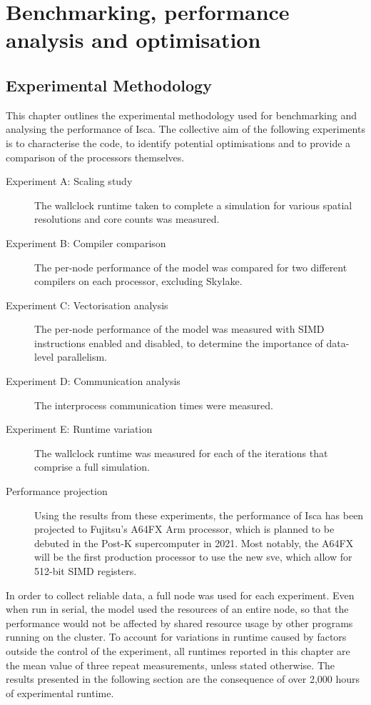 \documentclass[a4paper,11pt]{report}
\begin{document}
\part{Benchmarking, performance analysis and optimisation}
\chapter{Experimental Methodology}
This chapter outlines the experimental methodology used for benchmarking and analysing the performance of Isca. The collective aim of the following experiments is to characterise the code, to identify potential optimisations and to provide a comparison of the processors themselves.

\begin{description}

	\item[Experiment A: Scaling study] The wallclock runtime taken to complete a simulation for various spatial resolutions and core counts was measured.
	
	\item[Experiment B: Compiler comparison] The per-node performance of the model was compared for two different compilers on each processor, excluding Skylake.
	
	\item[Experiment C: Vectorisation analysis] The per-node performance of the model was measured with SIMD instructions enabled and disabled, to determine the importance of data-level parallelism. 
	
	\item[Experiment D: Communication analysis] The interprocess communication times were measured. 
	
	\item[Experiment E: Runtime variation] The wallclock runtime was measured for each of the iterations that comprise a full simulation.
	
	
	\item[Performance projection] Using the results from these experiments, the performance of Isca has been projected to Fujitsu's A64FX Arm processor, which is planned to be debuted in the Post-K supercomputer in 2021. Most notably, the A64FX will be the first production processor to use the new \gls{sve}, which allow for 512-bit SIMD registers.
\end{description}
\par
In order to collect reliable data, a full node was used for each experiment. Even when run in serial, the model used the resources of an entire node, so that the performance would not be affected by shared resource usage by other programs running on the cluster. To account for variations in runtime caused by factors outside the control of the experiment, all runtimes reported in this chapter are the mean value of three repeat measurements, unless stated otherwise. The results presented in the following section are the consequence of over 2,000 hours of experimental runtime.
\end{document}

